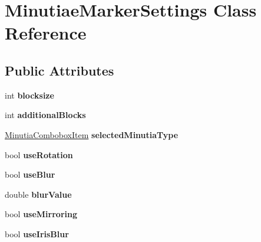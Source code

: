 \hypertarget{class_minutiae_marker_settings}{}\section{Minutiae\+Marker\+Settings Class Reference}
\label{class_minutiae_marker_settings}
\subsection*{Public Attributes}
\begin{DoxyCompactItemize}
\item 
\mbox{\label{class_minutiae_marker_settings_aaf10d84c4df40577abf267b6f4a1aad1}} 
int {\bfseries blocksize}
\item 
\mbox{\label{class_minutiae_marker_settings_a33a2299ff92f3b75d0dd5d52484d31a0}} 
int {\bfseries additional\+Blocks}
\item 
\mbox{\label{class_minutiae_marker_settings_ada2464866c146445b9ffb2058e632c02}} 
\mbox{\hyperlink{class_minutia_combobox_item}{Minutia\+Combobox\+Item}} {\bfseries selected\+Minutia\+Type}
\item 
\mbox{\label{class_minutiae_marker_settings_a65f3b8ca9b0075947769b44481ae03c7}} 
bool {\bfseries use\+Rotation}
\item 
\mbox{\label{class_minutiae_marker_settings_acb09c73ce1536583e15c8b764af76a5c}} 
bool {\bfseries use\+Blur}
\item 
\mbox{\label{class_minutiae_marker_settings_a3ebf9e68edee82ca238bdd1076d1e099}} 
double {\bfseries blur\+Value}
\item 
\mbox{\label{class_minutiae_marker_settings_a15d20729d7b711cdda602fdee5591f63}} 
bool {\bfseries use\+Mirroring}
\item 
\mbox{\label{class_minutiae_marker_settings_adea7c3b528f3751c072ecae1a2f6c07b}} 
bool {\bfseries use\+Iris\+Blur}
\item 

\end{DoxyCompactItemize}
